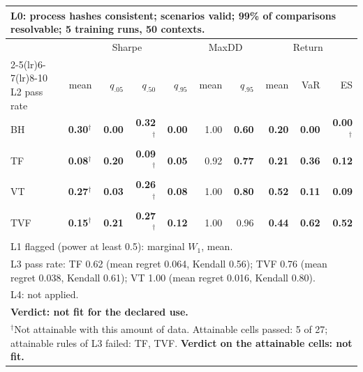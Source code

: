 \begin{tabular}{lrrrrrrrrr}
\toprule
\multicolumn{10}{p{13.5cm}}{L0: process hashes consistent; scenarios valid; 99\% of comparisons resolvable; 5 training runs, 50 contexts.} \\
\midrule
 & \multicolumn{4}{c}{Sharpe} & \multicolumn{2}{c}{MaxDD} & \multicolumn{3}{c}{Return} \\
\cmidrule(lr){2-5}\cmidrule(lr){6-7}\cmidrule(lr){8-10}
L2 pass rate & mean & $q_{.05}$ & $q_{.50}$ & $q_{.95}$ & mean & $q_{.95}$ & mean & VaR & ES \\
\midrule
BH & \textbf{0.30}$^{\dagger}$ & \textbf{0.00} & \textbf{0.32}$^{\dagger}$ & \textbf{0.00} & 1.00 & \textbf{0.60} & \textbf{0.20} & \textbf{0.00} & \textbf{0.00}$^{\dagger}$ \\
TF & \textbf{0.08}$^{\dagger}$ & \textbf{0.20} & \textbf{0.09}$^{\dagger}$ & \textbf{0.05} & 0.92 & \textbf{0.77} & \textbf{0.21} & \textbf{0.36} & \textbf{0.12} \\
VT & \textbf{0.27}$^{\dagger}$ & \textbf{0.03} & \textbf{0.26}$^{\dagger}$ & \textbf{0.08} & 1.00 & \textbf{0.80} & \textbf{0.52} & \textbf{0.11} & \textbf{0.09} \\
TVF & \textbf{0.15}$^{\dagger}$ & \textbf{0.21} & \textbf{0.27}$^{\dagger}$ & \textbf{0.12} & 1.00 & 0.96 & \textbf{0.44} & \textbf{0.62} & \textbf{0.52} \\
\midrule
\multicolumn{10}{p{13.5cm}}{L1 flagged (power at least 0.5): marginal $W_1$, mean.} \\
\multicolumn{10}{p{13.5cm}}{L3 pass rate: TF 0.62 (mean regret 0.064, Kendall 0.56); TVF 0.76 (mean regret 0.038, Kendall 0.61); VT 1.00 (mean regret 0.016, Kendall 0.80).} \\
\multicolumn{10}{p{13.5cm}}{L4: not applied.} \\
\multicolumn{10}{p{13.5cm}}{\textbf{Verdict: not fit for the declared use.}} \\
\multicolumn{10}{p{13.5cm}}{$^{\dagger}$Not attainable with this amount of data. Attainable cells passed: 5 of 27; attainable rules of L3 failed: TF, TVF. \textbf{Verdict on the attainable cells: not fit.}} \\
\bottomrule
\end{tabular}
